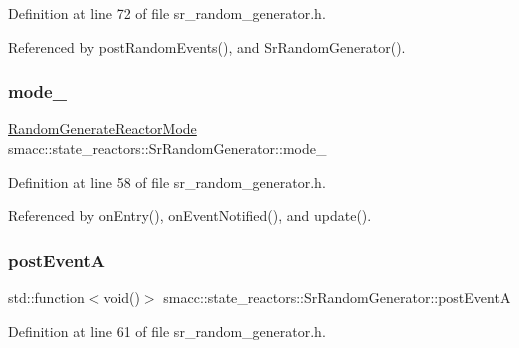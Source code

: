 Definition at line 72 of file sr\+\_\+random\+\_\+generator.\+h.



Referenced by post\+Random\+Events(), and Sr\+Random\+Generator().

\mbox{\label{classsmacc_1_1state__reactors_1_1SrRandomGenerator_a10984da2fb51badf4fe6f25861120735}} 
\subsubsection{\texorpdfstring{mode\+\_\+}{mode\_}}
{\footnotesize\ttfamily \hyperlink{namespacesmacc_1_1state__reactors_a038f8e362ad6d35494c940ee4c97a52e}{Random\+Generate\+Reactor\+Mode} smacc\+::state\+\_\+reactors\+::\+Sr\+Random\+Generator\+::mode\+\_\+}



Definition at line 58 of file sr\+\_\+random\+\_\+generator.\+h.



Referenced by on\+Entry(), on\+Event\+Notified(), and update().

\mbox{\label{classsmacc_1_1state__reactors_1_1SrRandomGenerator_ac157de4b848ebc5da1acb593f7b25108}} 
\subsubsection{\texorpdfstring{post\+EventA}{postEventA}}
{\footnotesize\ttfamily std\+::function$<$void()$>$ smacc\+::state\+\_\+reactors\+::\+Sr\+Random\+Generator\+::post\+EventA\hspace{0.3cm}{\ttfamily [private]}}



Definition at line 61 of file sr\+\_\+random\+\_\+generator.\+h.



